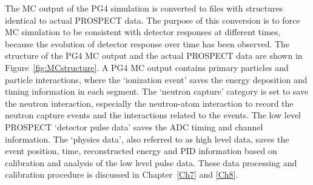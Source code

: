 
The MC output of the PG4 simulation is converted to files with structures identical to actual PROSPECT data.
The purpose of this conversion is to force MC simulation to be consistent with detector responses at different times, because the evolution of detector response over time has been observed.
The structure of the PG4 MC output and the actual PROSPECT data are shown in Figure~\ref{fig:MCstructure}.
A PG4 MC output contains primary particles and particle interactions, where the `ionization event' saves the energy deposition and timing information in each segment. 
The `neutron capture' category is set to save the neutron interaction, especially the neutron-atom interaction to record the neutron capture events and the interactions related to the events.
The low level PROSPECT `detector pulse data' saves the ADC timing and channel information.
The `physics data', also referred to as high level data, saves the event position, time, reconstructed energy and PID information based on calibration and analysis of the low level pulse data.
These data processing and calibration procedure is discussed in Chapter~\ref{Ch7} and \ref{Ch8}.

